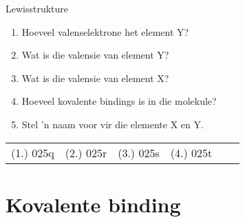 \begin{exercises}{Lewisstrukture}
{\begin{enumerate}[noitemsep, label=\textbf{\arabic*}. ]
    \setcounter{subfigure}{0}
	\begin{figure}[H] %
\begin{center}
\end{center}
 \end{figure}       \label{m38701*id141181}\begin{enumerate}[noitemsep, label=\textbf{\alph*}. ] 
            \label{m38701*uid39}\item Hoeveel valenselektrone het element $\text{Y}$?
\label{m38701*uid40}\item Wat is die valensie van element $\text{Y}$?
\label{m38701*uid41}\item Wat is die valensie van element $\text{X}$?
\label{m38701*uid42}\item Hoeveel kovalente bindings is in die molekule?
\label{m38701*uid43}\item Stel 'n naam voor vir die elemente $\text{X}$ en $\text{Y}$.
\end{enumerate}
                \end{enumerate}

\par \practiceinfo
\par \begin{tabular}[h]{cccccc}
(1.)	025q	&
(2.)	025r	&
(3.)	025s	&
(4.)	025t	&
\end{tabular}
}
\end{exercises}


            \section{Kovalente binding}
            \nopagebreak
            \label{m38704*uid6}
